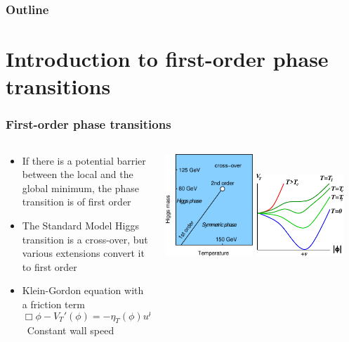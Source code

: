 \begin{frame}
    \titlepage
\end{frame}

\begin{frame}
    \frametitle{Outline}
    \tableofcontents
\end{frame}

\section{Introduction to first-order phase transitions}

\begin{frame}
    \frametitle{First-order phase transitions}
    \begin{columns}
    \begin{column}{0.5\textwidth}
        \begin{itemize}
            \item If there is a potential barrier between the local and the global minimum, the phase transition is of first order
            \item The Standard Model Higgs transition is a cross-over, but various extensions convert it to first order
            \item Klein-Gordon equation with a friction term
            \begin{equation}
                \Box \phi - V_T'(\phi) = - \eta_T(\phi) u^\mu \partial_\mu \phi
            \end{equation}
            \textrightarrow \ Constant wall speed
        \end{itemize}
    \end{column}
    \begin{column}{0.5\textwidth}
        \includegraphics[width=0.45\textwidth]{../fig/lecture_notes/smPhaseDiag2}%
        \hfill%
        \includegraphics[width=0.45\textwidth]{../fig/lecture_notes/ThermalHiggsPotential}

\end{column}
\end{columns}
\end{frame}
